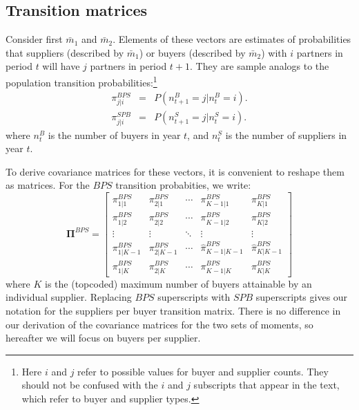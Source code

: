 \documentclass[12pt]{article} \usepackage{amsmath,amssymb,amsthm,geometry,graphicx,setspace,algorithm,algpseudocode,float}
\begin{document}
\subsection{Transition matrices}

Consider first $\bar{m}_{1}$ and $\bar{m}_{2}$. Elements of these vectors
are estimates of probabilities that suppliers (described by  $\bar{m}_{1}$) or
buyers (described by $\bar{m}_{2}$) with $i$ partners in period $t$ will
have $j$ partners in period $t+1.$ They are sample analogs to the population
transition probabilities:\footnote{%
Here $i$ and $j$ refer to possible values for buyer and supplier counts. They
should not be confused with the $i$ and $j$ subscripts that appear in the
text, which refer to buyer and supplier types.\bigskip } 
\begin{eqnarray*}
\pi _{j|i}^{BPS} &=&P(n_{t+1}^{B}=j|n_{t}^{B}=i). \\
\pi _{j|i}^{SPB} &=&P(n_{t+1}^{S}=j|n_{t}^{S}=i).
\end{eqnarray*}%
where $n_{t}^{B}$ is the number of buyers in year $t$, and $n_{t}^{S}$ is the number of suppliers in year $t.$ 

To derive covariance matrices for these vectors, it is convenient to reshape
them as matrices. For the $BPS$ transition probabities, we write:%
\begin{equation*}
\mathbf{\Pi }^{BPS}=\left[ 
\begin{array}{ccccc}
\pi _{1|1}^{BPS} & \pi _{2|1}^{BPS} & \cdots  & \pi _{K-1|1}^{BPS} & \pi
_{K|1}^{BPS} \\ 
\pi _{1|2}^{BPS} & \pi _{2|2}^{BPS} & \cdots  & \pi _{K-1|2}^{BPS} & \pi
_{K|2}^{BPS} \\ 
\vdots  & \vdots  & \ddots  & \vdots  & \vdots  \\ 
\pi _{1|K-1}^{BPS} & \pi _{2|K-1}^{BPS} & \cdots  & \hat{\pi}_{K-1|K-1}^{BPS}
& \hat{\pi}_{K|K-1}^{BPS} \\ 
\pi _{1|K}^{BPS} & \pi _{2|K}^{BPS} & \cdots  & \pi _{K-1|K}^{BPS} & \pi
_{K|K}^{BPS}%
\end{array}%
\right] 
\end{equation*}%
where $K$ is the (topcoded) maximum number of buyers attainable by an
individual supplier. Replacing $BPS$ superscripts with $SPB$ superscripts
gives our notation for the suppliers per buyer transition matrix. There is no
difference in our derivation of the covariance matrices for the two sets of
moments, so hereafter we will focus on buyers per supplier.
\end{document}

